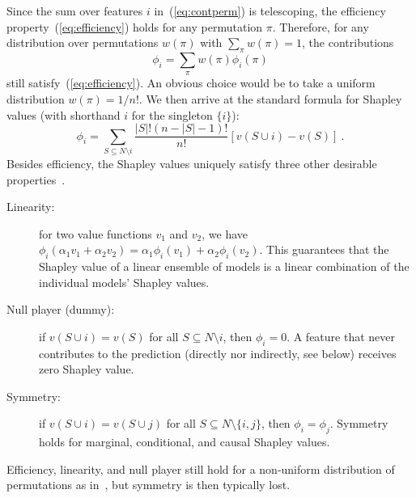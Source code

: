\documentclass{article}
\newcommand{\vX}{\mathbf{X}}
\newcommand{\vx}{\mathbf{x}}
\newcommand{\expectation}{\mathbb{E}}
\newcommand{\contribution}{{\phi}}
\newcommand{\val}{{v}}
\newcommand{\perm}{\pi}
\newcommand{\operator}{\mathit{op}}
\newcommand{\svop}[1]{\operator(\vx_{#1})}
\newcommand{\allfeatures}{{N}}
\begin{document}
Since the sum over features $i$ in~(\ref{eq:contperm}) is telescoping, the efficiency property~(\ref{eq:efficiency}) holds for any permutation $\perm$.
Therefore, for any distribution over permutations $w(\perm)$ with $\sum_{\perm} w(\perm) = 1$, the contributions
\begin{equation}
\contribution_i = \sum_{\perm} w(\perm) \contribution_i(\perm)
\label{eq:shapperm}
\end{equation}
still satisfy~(\ref{eq:efficiency}). An obvious choice would be to take a uniform distribution $w(\perm) = 1/n!$. We then arrive at the standard formula for Shapley values (with shorthand $i$ for the singleton $\{i\}$):
\[
\contribution_i = \sum_{S \subseteq \allfeatures\setminus i} \frac{|S|! (n-|S|-1)!}{n!} \left[\val(S \cup i) - \val(S) \right] \: .
\]
Besides efficiency, the Shapley values uniquely satisfy three other desirable properties~\cite{shapley1953value}.
\begin{description}
	\item[Linearity:] for two value functions $\val_1$ and $\val_2$, we have $\contribution_i(\alpha_1 \val_1 + \alpha_2 \val_2) = \alpha_1 \contribution_i(\val_1) + \alpha_2 \contribution_i(\val_2)$. This guarantees that the Shapley value of a linear ensemble of models is a linear combination of the individual models' Shapley values.
	\item[Null player (dummy):] if $\val(S \cup i) = \val(S)$ for all $S \subseteq \allfeatures \setminus i$, then $\contribution_i = 0$. A feature that never contributes to the prediction (directly nor indirectly, see below) receives zero Shapley value.
	\item[Symmetry:] if $\val(S \cup i) = \val(S \cup j)$ for all  $S \subseteq \allfeatures \setminus \{i,j\}$, then $\contribution_i = \contribution_j$. Symmetry holds for marginal, conditional, and causal Shapley values.
\end{description}
Efficiency, linearity, and null player still hold for a non-uniform distribution of permutations as in~\cite{frye2019asymmetric}, but symmetry is then typically lost.
\end{document}
